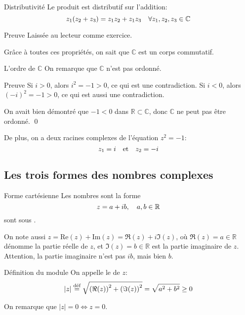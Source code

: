 \documentclass{article}
\begin{document}
\begin{parag}{Distributivité}
    Le produit est distributif sur l'addition:
    \[z_1\left(z_2 + z_3\right) = z_1 z_2 + z_1 z_3 \mathspace \forall z_1, z_2, z_3 \in \mathbb{C}\]
    \begin{subparag}{Preuve}
        Laissée au lecteur comme exercice.
    \end{subparag}


    Grâce à toutes ces propriétés, on sait que $\mathbb{C}$ est un corps commutatif.
\end{parag}


\begin{parag}{L'ordre de $\mathbb{C}$}
    On remarque que $\mathbb{C}$ n'est pas ordonné.

    \begin{subparag}{Preuve}
        Si $i > 0$, alors $i^2 = -1 > 0$, ce qui est une contradiction.
        Si $i < 0$, alors $\left(-i\right)^2 = -1 > 0$, ce qui est aussi une contradiction.

        On avait bien démontré que $-1 < 0$ dans $\mathbb{R} \subset \mathbb{C}$, donc $\mathbb{C}$ ne peut pas être ordonné.
        \qed
    \end{subparag}

    De plus, on a deux racines complexes de l'équation $z^2 = -1$:
    \[z_1 = i \quad \text{et} \quad z_2 = -i\]
\end{parag}

\subsection{Les trois formes des nombres complexes}

\begin{parag}{Forme cartésienne}
    Les nombres sont la forme
    \[z = a + ib, \quad a,b \in \mathbb{R}\]
    sont sous .

    On note aussi $z = \text{Re}\left(z\right) + \text{Im}\left(z\right) = \Re\left(z\right) + i\Im\left(z\right)$, où $\Re\left(z\right) = a\in \mathbb{R}$ dénomme la partie réelle de $z$, et $\Im\left(z\right) = b \in \mathbb{R}$ est la partie imaginaire de $z$. Attention, la partie imaginaire n'est pas $ib$, mais bien $b$.
\end{parag}

\begin{parag}{Définition du module}
    On appelle le  de $z$:
    \[\left|z\right| \over{=}{déf} \sqrt{\left(\Re\left(z\right)\right)^2 + \left(\Im\left(z\right)\right)^2} = \sqrt{a^2 + b^2} \geq 0\]

    On remarque que $\left|z\right| = 0 \iff z = 0$.

\end{parag}
\end{document}
